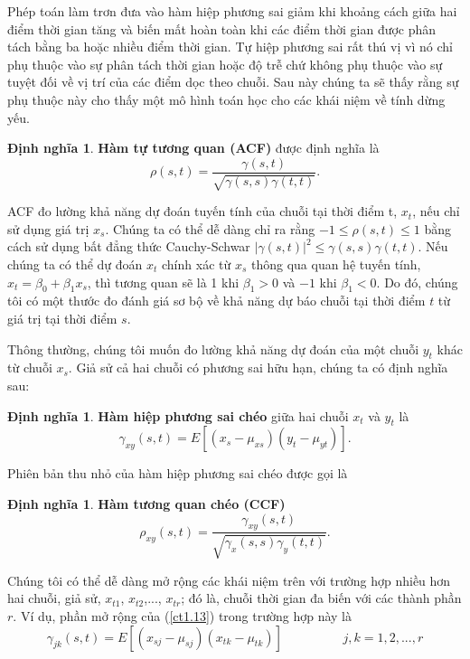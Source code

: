 \documentclass[12pt, a4paper,oneside]{book}
\theoremstyle{definition}
\newtheorem{dn}[theo]{Định nghĩa}
\begin{document}
Phép toán làm trơn đưa vào hàm hiệp phương sai giảm khi khoảng cách giữa hai điểm thời gian tăng và biến mất hoàn toàn khi các điểm thời gian được phân tách bằng ba hoặc nhiều điểm thời gian. Tự hiệp phương sai rất thú vị vì nó chỉ phụ thuộc vào sự phân tách thời gian hoặc độ trễ chứ không phụ thuộc vào sự tuyệt đối về vị trí của các điểm dọc theo chuỗi. Sau này chúng ta sẽ thấy rằng sự phụ thuộc này cho thấy một mô hình toán học cho các khái niệm về tính dừng yếu.
\begin{dn}\textbf{Hàm tự tương quan (ACF)} được định nghĩa là
	\begin{equation}
	\rho(s,t) = \dfrac{\gamma(s,t)}{\sqrt{\gamma(s,s)\gamma(t,t)}}. \label{ct1.13}
	\end{equation}
\end{dn}
ACF đo lường khả năng dự đoán tuyến tính của chuỗi tại thời điểm t, $x_t$, nếu chỉ sử dụng giá trị $x_s$. Chúng ta có thể dễ dàng chỉ ra rằng $-1 \le \rho(s,t)\le 1$ bằng cách sử dụng bất đẳng thức Cauchy-Schwar $\left| \gamma(s,t)\right|^{2}\leq\gamma(s,s)\gamma(t,t).$ Nếu chúng ta có thể dự đoán $x_t$ chính xác từ $x_s$ thông qua quan hệ tuyến tính, $x_t=\beta_0+\beta_1 x_s$, thì tương quan sẽ là 1 khi $\beta_1>0$ và $-1$ khi $\beta_1<0$. Do đó, chúng tôi có một thước đo đánh giá sơ bộ về khả năng dự báo chuỗi tại thời điểm $t$ từ giá trị tại thời điểm $s$. 

Thông thường, chúng tôi muốn đo lường khả năng dự đoán của một chuỗi $y_t$ khác từ chuỗi $x_s$. Giả sử cả hai chuỗi có phương sai hữu hạn, chúng ta có định nghĩa sau:
\begin{dn}\textbf{Hàm hiệp phương sai chéo} giữa hai chuỗi $x_{t}$ và $y_{t}$ là
	\begin{equation}
	\gamma_{xy}(s,t) = E[(x_{s}- \mu_{xs})(y_{t}- \mu_{yt})]. \label{ct1.14}
	\end{equation}
\end{dn}
Phiên bản thu nhỏ của hàm hiệp phương sai chéo được gọi là
\begin{dn}\textbf{Hàm tương quan chéo (CCF)}
	\begin{equation}
	\rho_{xy}(s,t) = \dfrac{\gamma_{xy}(s,t)}{\sqrt{\gamma_{x}(s,s)\gamma_{y}(t,t)}}. \label{ct1.15}
	\end{equation}
\end{dn}
	
Chúng tôi có thể dễ dàng mở rộng các khái niệm trên với trường hợp nhiều hơn hai chuỗi, giả sử, $x_{t1}$, $x_{t2}$,..., $x_{tr}$; đó là, chuỗi thời gian đa biến với các thành phần $r$. Ví dụ, phần mở rộng của (\ref{ct1.13}) trong trường hợp này là
	\begin{equation}
		\gamma_{jk}(s,t) = E [(x_{sj}-\mu_{sj})(x_{tk}-\mu_{tk})] \hspace{2cm}   j,k= 1,2,...,r \label{ct1.16}
	\end{equation}
\end{document}
